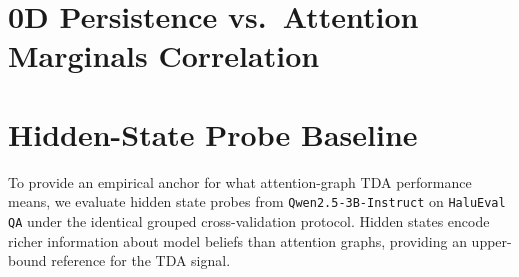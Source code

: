 \documentclass{article}
\begin{document}
\section{0D Persistence vs.\ Attention Marginals Correlation}
\label{app:prop4_corr}

\begin{table}[ht]
\centering
\small
{}
\caption{\textbf{Empirical Support for \S\ref{sec:method}'s Observation.} Spearman correlation between total 0D persistence and peak row-attention (mean max-row attention weight; not verified to be a dedicated sink/BOS-column statistic). Strong positive correlations on Qwen2.5-3B ($r \ge 0.80$) and Phi-3 ($r = 0.82$) show $0$D TDA is a strong monotone function of this non-topological statistic \emph{in those settings}; the weak correlation on Qwen2.5-1.5B ($r=0.21$, despite that setting's highest-in-paper $0$D AUC of $0.904$) shows this is not a uniform reduction, refuting $\mathbf{H^{(3)}}$ (\S\ref{sec:audit}) as a general claim.}
\label{tab:prop4_corr}
\end{table}



\section{Hidden-State Probe Baseline}
\label{app:hs_probe}

To provide an empirical anchor for what attention-graph TDA performance means, we evaluate
hidden state probes from \texttt{Qwen2.5-3B-Instruct} on \texttt{HaluEval QA}
under the identical grouped cross-validation protocol. Hidden states encode richer information about
model beliefs than attention graphs, providing an upper-bound reference for the TDA signal.
\end{document}
